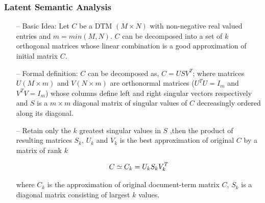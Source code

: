 \documentclass{beamer}
\begin{document}
\begin{frame}[noframenumbering] \label{LSA} 
\frametitle{Latent Semantic Analysis}
\begin{itemize}
\item[--] Basic Idea: Let $C$ be a DTM $(M \times N)$ with non-negative real valued entries and $m = min(M,N)$. $C$ can be decomposed into a set of $k$ orthogonal matrices whose linear combination is a good approximation of initial matrix $C$.
\item[--] Formal definition: $C$ can be decomposed as, $C = U S V^T$; where matrices $U (M \times m)$ and $V (N \times m)$ are orthonormal matrices ($U^TU = I_m$ and $V^TV = I_m$) whose columns define left and right singular vectors respectively and $S$ is a $m \times m$ diagonal matrix of singular values of $C$ decreasingly ordered along its diagonal. 

\item[--] Retain only the $k$ greatest singular values in $S$ ,then the product of resulting matrices $S_k$, $U_k$ and $V_k$ is the best approximation of original $C$ by a matrix of rank $k$

\begin{equation*}
\title{LSA_normalised}
C \simeq C_k = U_k S_k V_k^T
\end{equation*}

where $C_k$ is the approximation of original document-term matrix $C$, $S_k$ is a diagonal matrix consisting of largest $k$ values.

\end{itemize} 

\end{frame}
\end{document}
